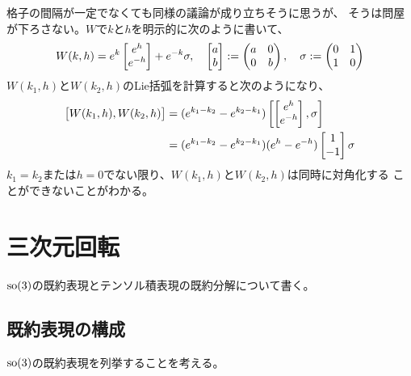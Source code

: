 {	格子の間隔が一定でなくても同様の議論が成り立ちそうに思うが、
	そうは問屋が下ろさない。$W$で$k$と$h$を明示的に次のように書いて、
	\begin{equation*}\begin{split}
		W(k,h) = e^k\begin{bmatrix}{e^h}\\{e^{-h}}\end{bmatrix} + e^{-k}\sigma
		,\quad \begin{bmatrix}{a}\\{b}\end{bmatrix} := \begin{pmatrix}
			a & 0 \\ 0 & b
		\end{pmatrix},\quad \sigma := \begin{pmatrix}
			0 & 1 \\ 1 & 0
		\end{pmatrix}
	\end{split}\end{equation*}
	$W(k_1,h)$と$W(k_2,h)$のLie括弧を計算すると次のようになり、
	\begin{equation*}\begin{split}
		\bigl[W(k_1,h),W(k_2,h)\bigr] 
		&= (e^{k_1-k_2} - e^{k_2-k_1})\left[\begin{bmatrix}{e^h}\\{e^{-h}}\end{bmatrix},\sigma\right] \\
		&= (e^{k_1-k_2} - e^{k_2-k_1})(e^h - e^{-h})\begin{bmatrix}{1}\\{-1}\end{bmatrix}\sigma \\
	\end{split}\end{equation*}
	$k_1=k_2$または$h=0$でない限り、$W(k_1,h)$と$W(k_2,h)$は同時に対角化する
	ことができないことがわかる。

\section{三次元回転}\label{s1:三次元回転} %
	${\operatorname{so}}(3)$の既約表現とテンソル積表現の既約分解について書く。

\subsection{既約表現の構成}\label{s2:既約表現の構成} %
	${\operatorname{so}}(3)$の既約表現を列挙することを考える。

}
